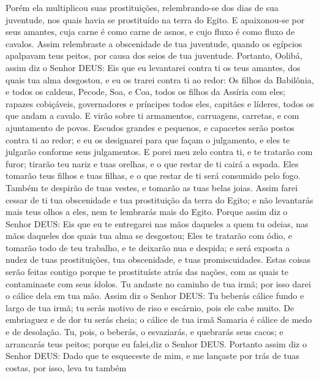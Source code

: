 {  Porém ela multiplicou suas prostituições, relembrando-se dos dias de sua juventude, nos quais havia se prostituído na terra do Egito.
  E apaixonou-se por seus amantes, cuja carne é como carne de asnos, e cujo fluxo é como fluxo de cavalos.
  Assim relembraste a obscenidade de tua juventude, quando os egípcios apalpavam teus peitos, por causa dos seios de tua juventude.
  Portanto, Oolibá, assim diz o Senhor DEUS: Eis que eu levantarei contra ti os teus amantes, dos quais tua alma desgostou, e eu os trarei contra ti ao redor:
  Os filhos da Babilônia, e todos os caldeus, Pecode, Soa, e Coa, todos os filhos da Assíria com eles; rapazes cobiçáveis, governadores e príncipes todos eles, capitães e líderes, todos os que andam a cavalo.
  E virão sobre ti
{} armamentos,
 carruagens, carretas, e com ajuntamento de povos. Escudos grandes e pequenos, e capacetes serão postos contra ti ao redor; e eu os designarei para que façam o julgamento,
 e eles te julgarão conforme seus julgamentos.
  E porei meu zelo contra ti, e te tratarão com furor; tirarão teu nariz e tuas orelhas, e o que restar de ti cairá a espada. Eles tomarão teus filhos e tuas filhas, e o que restar de ti será consumido pelo fogo.
  Também te despirão de tuas vestes, e tomarão as tuas belas joias.
  Assim farei cessar de ti tua obscenidade e tua prostituição da terra do Egito; e não levantarás mais teus olhos a eles, nem te lembrarás mais do Egito.
  Porque assim diz o Senhor DEUS: Eis que eu te entregarei nas mãos daqueles a quem tu odeias, nas mãos daqueles dos quais tua alma se desgostou;
  Eles te tratarão com ódio, e tomarão todo
{} de teu trabalho, e te deixarão nua e despida; e será exposta a nudez de tuas prostituições, tua obscenidade, e tuas promiscuidades.
  Estas coisas serão feitas contigo porque te prostituíste atrás das nações, com as quais te contaminaste com seus ídolos.
  Tu andaste no caminho de tua irmã; por isso darei o cálice dela em tua mão.
  Assim diz o Senhor DEUS: Tu beberás cálice fundo e largo de tua irmã; tu serás motivo de riso e escárnio, pois ele cabe muito.
  De embriaguez e de dor tu serás cheia; o cálice de tua irmã Samaria é cálice de medo e de desolação.
  Tu, pois, o beberás, o esvaziarás, e quebrarás seus cacos; e arrancarás teus peitos; porque eu falei,diz o Senhor DEUS.
  Portanto assim diz o Senhor DEUS: Dado que te esqueceste de mim, e me lançaste por trás de tuas costas, por isso, leva tu também
}
